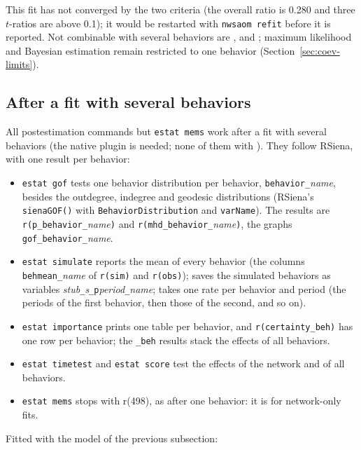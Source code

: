 This fit has not converged by the two criteria (the overall ratio is 0.280 and three $t$-ratios are above 0.1); it would be restarted with \texttt{nwsaom refit} before it is reported. Not combinable with several behaviors are ,  and ; maximum likelihood and Bayesian estimation remain restricted to one behavior (Section~\ref{sec:coev-limits}).

\subsection{After a fit with several behaviors}\label{sec:multibeh-post}

All postestimation commands but \texttt{estat mems} work after a fit with several behaviors (the native plugin is needed; none of them with ). They follow RSiena, with one result per behavior:
\begin{itemize}[nosep]
\item \texttt{estat gof} tests one behavior distribution per behavior, \texttt{behavior\_}\emph{name}, besides the outdegree, indegree and geodesic distributions (RSiena's \texttt{sienaGOF()} with \texttt{BehaviorDistribution} and \texttt{varName}). The results are \texttt{r(p\_behavior\_}\emph{name}\texttt{)} and \texttt{r(mhd\_behavior\_}\emph{name}\texttt{)}, the graphs \texttt{gof\_behavior\_}\emph{name}.
\item \texttt{estat simulate} reports the mean of every behavior (the columns \texttt{behmean\_}\emph{name} of \texttt{r(sim)} and \texttt{r(obs)});  saves the simulated behaviors as variables \emph{stub}\texttt{\_}\emph{s}\texttt{\_p}\emph{period}\texttt{\_}\emph{name};  takes one rate per behavior and period (the periods of the first behavior, then those of the second, and so on).
\item \texttt{estat importance} prints one table per behavior, and \texttt{r(certainty\_beh)} has one row per behavior; the \texttt{\_beh} results stack the effects of all behaviors.
\item \texttt{estat timetest} and \texttt{estat score} test the effects of the network and of all behaviors.
\item \texttt{estat mems} stops with r(498), as after one behavior: it is for network-only fits.
\end{itemize}
Fitted with the model of the previous subsection:

